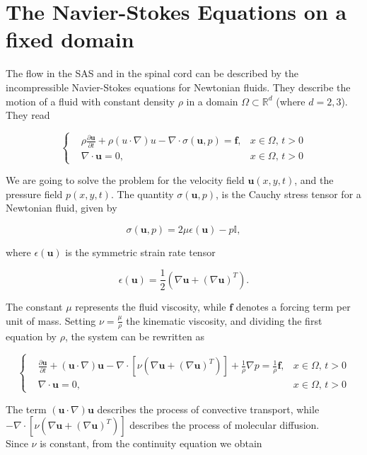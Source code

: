 \documentclass[11pt,a4paper,titlepage]{report}
\begin{document}
\section{The Navier-Stokes Equations on a fixed domain}

The flow in the SAS and in the spinal cord can be described by the incompressible Navier-Stokes equations for Newtonian fluids. They describe the motion of a fluid with constant density $\rho$ in a domain $\Omega \subset \mathbb{R}^d$ (where $d=2,3$). They read


\[
\left\{  
\begin{aligned}
&\rho \frac{\partial \mathbf{u}}{\partial t} + \rho (u \cdot \nabla)u - \nabla \cdot \sigma(\mathbf{u},p) = \mathbf{f},  & x \in \Omega, \, t>0 \\
& \nabla \cdot \mathbf{u} = 0, & x \in \Omega, \, t>0
\end{aligned}
\right.
\]

We are going to solve the problem for the velocity field $\mathbf{u}(x,y,t)$, and the pressure field $p(x,y,t)$. The quantity $\sigma(\mathbf{u}, p)$, is the Cauchy stress tensor for a Newtonian fluid, given by

\[
\sigma(\mathbf{u}, p) = 2 \mu \epsilon(\mathbf{u}) - p \mathbb{I},
\]

where $\epsilon(\mathbf{u})$ is the symmetric strain rate tensor

\[
\epsilon(\mathbf{u}) = \frac{1}{2} (\nabla \mathbf{u} + (\nabla \mathbf{u})^T).
\]

The constant $\mu$ represents the fluid viscosity, while $\mathbf{f}$ denotes a forcing term per unit of mass. Setting $\nu = \frac{\mu}{\rho}$ the kinematic viscosity, and dividing the first equation by $\rho$, the system can be rewritten as

\[
\left\{  
\begin{aligned}
&\frac{\partial \mathbf{u}}{\partial t} + ( \mathbf{u} \cdot \nabla) \mathbf{u} - \nabla \cdot [ \nu (\nabla \mathbf{u} + (\nabla  \mathbf{u})^T)] + \frac{1}{\rho} \nabla p = \frac{1}{\rho} \mathbf{f},  & x \in \Omega, \, t>0 \\
& \nabla \cdot \mathbf{u} = 0, & x \in \Omega, \, t>0
\end{aligned}
\right.
\]

The term $(\mathbf{u} \cdot \nabla)\mathbf{u}$ describes the process of convective transport, while $- \nabla \cdot [ \nu (\nabla \mathbf{u} + (\nabla  \mathbf{u})^T)] $ describes the process of molecular diffusion.\\
Since $\nu$ is constant, from the continuity equation we obtain
\end{document}
